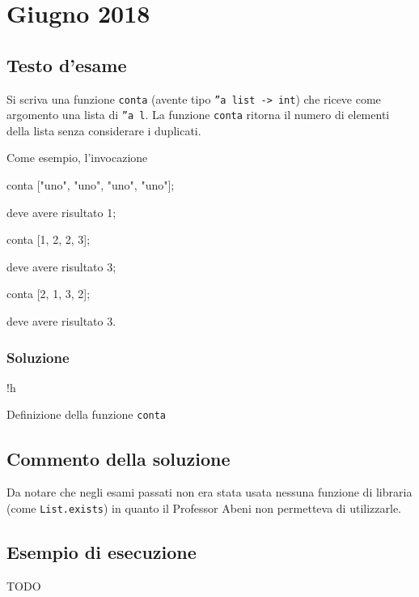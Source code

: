 \section{Giugno 2018}

\subsection{Testo d'esame}

Si scriva una funzione \texttt{conta} (avente tipo \texttt{''a list -> int}) che riceve come argomento una lista di \texttt{''a l}.
La funzione \texttt{conta} ritorna il numero di elementi della lista senza considerare i duplicati.

\medskip
Come esempio, l'invocazione

\begin{smlcode}
conta ["uno", "uno", "uno", "uno"];
\end{smlcode}

deve avere risultato 1;

\begin{smlcode}
conta [1, 2, 2, 3];
\end{smlcode}

deve avere risultato 3;

\begin{smlcode}
conta [2, 1, 3, 2];
\end{smlcode}

deve avere risultato 3.

\subsubsection{Soluzione}

\begin{listing}{!h}
\caption{Definizione della funzione \texttt{conta}}
\end{listing}

\subsection{Commento della soluzione}

Da notare che negli esami passati non era stata usata nessuna funzione di libraria (come \texttt{List.exists}) in quanto il Professor Abeni non permetteva di utilizzarle.

\subsection*{Esempio di esecuzione}

TODO
